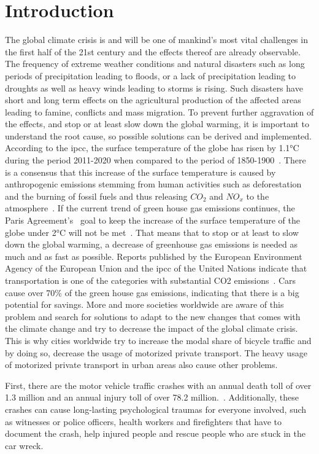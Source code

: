 \cleardoublepage
\chapter{Introduction}
\label{cha:introduction}
The global climate crisis is and will be one of mankind's most vital challenges in the first half of the 21st century and the effects thereof are already observable.
The frequency of extreme weather conditions and natural disasters such as long periods of precipitation leading to floods, or a lack of precipitation leading to droughts as well as heavy winds leading to storms is rising.
Such disasters have short and long term effects on the agricultural production of the affected areas leading to famine, conflicts and mass migration.
To prevent further aggravation of the effects, and stop or at least slow down the global warming, it is important to understand the root cause, so possible solutions can be derived and implemented. 
According to the \ac{ipcc}, the surface temperature of the globe has risen by 1.1°C during the period 2011-2020 when compared to the period of 1850-1900~\cite{lee2023climate}.
There is a consensus that this increase of the surface temperature is caused by anthropogenic emissions stemming from human activities such as deforestation and the burning of fossil fuels and thus releasing $CO_{2}$ and $NO_{x}$ to the atmosphere~\cite{archer2010climate}.
If the current trend of green house gas emissions continues, the Paris Agreement's~\cite{un2015paris} goal to keep the increase of the surface temperature of the globe under 2°C will not be met~\cite{noah2023data}.
That means that to stop or at least to slow down the global warming, a decrease of greenhouse gas emissions is needed as much and as fast as possible.
Reports published by the European Environment Agency of the European Union and the \ac{ipcc} of the United Nations indicate that transportation is one of the categories with substantial CO2 emissions~\cite{lee2023climate2}.
Cars cause over 70\% of the green house gas emissions, indicating that there is a big potential for savings.
More and more societies worldwide are aware of this problem and search for solutions to adapt to the new changes that comes with the climate change and try to decrease the impact of the global climate crisis.
This is why cities worldwide try to increase the modal share of bicycle traffic and by doing so, decrease the usage of motorized private transport.
The heavy usage of motorized private transport in urban areas also cause other problems.

First, there are the motor vehicle traffic crashes with an annual death toll of over 1.3 million and an annual injury toll of over 78.2 million.~\cite{bhalla2014transport}.
Additionally, these crashes can cause long-lasting psychological traumas for everyone involved, such as witnesses or police officers, health workers and firefighters that have to document the crash, help injured people and rescue people who are stuck in the car wreck.


